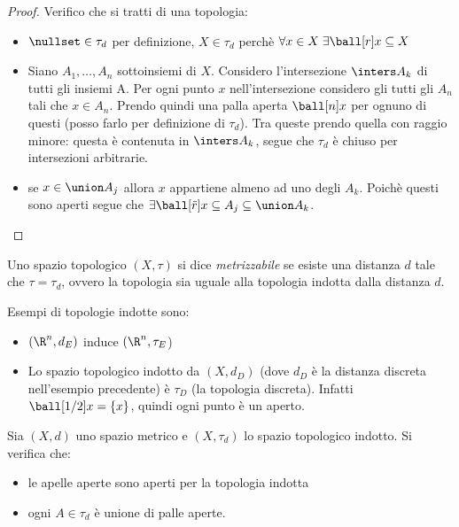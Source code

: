 \begin{proof}
Verifico che si tratti di una topologia:
\begin{itemize}
\item $\nullset \in \tau_d$ per definizione, $X \in \tau_d$ perchè $\forall x \in X \; \exists \ball[r]x \subseteq X$
\item Siano $A_1,\ldots,A_n$ sottoinsiemi di $X$. Considero l'intersezione $\inters A_k$ di tutti gli insiemi A. Per ogni punto $x$ nell'intersezione considero gli tutti gli $A_n$ tali che $x \in A_n$. Prendo quindi una palla aperta $\ball[n]x$ per ognuno di questi (posso farlo per definizione di $\tau_d$).
Tra queste prendo quella con raggio minore: questa è contenuta in $\inters A_k$, segue che $\tau_d$ è chiuso per intersezioni arbitrarie.
\item se $x \in \union A_j$ allora $x$ appartiene almeno ad uno degli $A_k$. Poichè questi sono aperti segue che  $\exists \ball[\tilde r]x \subseteq A_j \subseteq \union A_k$.
\end{itemize}
\end{proof}

\begin{defn}
Uno spazio topologico $(X,\tau)$ si dice \emph{metrizzabile} se esiste una distanza $d$ tale che $\tau=\tau_d$, ovvero la topologia sia uguale alla topologia indotta dalla distanza $d$.
\end{defn}

\begin{es}
Esempi di topologie indotte sono:
\begin{itemize}
\item $(\R^n,d_E)$  induce $(\R^n,\tau_E$)
\item Lo spazio topologico indotto da $(X,d_D)$ (dove $d_D$ è la distanza discreta nell'esempio precedente) è $\tau_D$ (la topologia discreta). Infatti $\ball[1/2]x = \{x\}$, quindi ogni punto è un aperto.
\end{itemize}
\end{es}

\begin{prop}
Sia $(X,d)$ uno spazio metrico e $(X,\tau_d)$ lo spazio topologico indotto. Si  verifica che:
\begin{itemize}
\item le apelle aperte sono aperti per la topologia indotta
\item ogni $A \in \tau_d$ è unione di palle aperte.
\end{itemize}
\end{prop}

